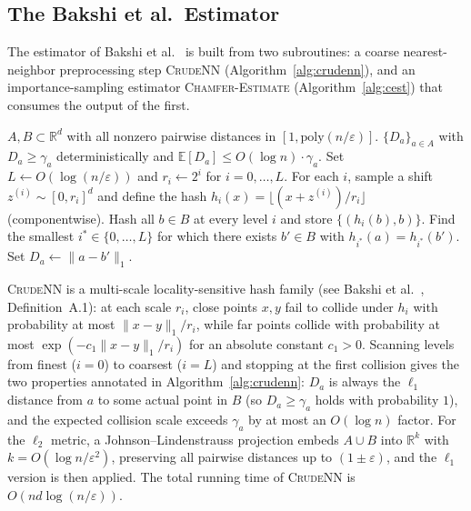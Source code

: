 \documentclass[conference]{IEEEtran}
\begin{document}
\subsection{The Bakshi et al.\ Estimator}
\label{sec:bakshi-summary}

The estimator of Bakshi et al.~\cite{bakshi2023near} is built from two
subroutines: a coarse nearest-neighbor preprocessing step
\textsc{CrudeNN} (Algorithm~\ref{alg:crudenn}), and an importance-sampling
estimator \textsc{Chamfer-Estimate} (Algorithm~\ref{alg:cest}) that
consumes the output of the first.

\begin{algorithm}[t]
\caption{$\textsc{CrudeNN}(A, B)$ for the $\ell_1$ metric}
\label{alg:crudenn}
\begin{algorithmic}[1]
\REQUIRE $A, B \subset \mathbb{R}^d$ with all nonzero pairwise
distances in $[1, \mathrm{poly}(n/\varepsilon)]$.
\ENSURE $\{D_a\}_{a \in A}$ with $D_a \geq \gamma_a$ deterministically
        and $\mathbb{E}[D_a] \leq O(\log n) \cdot \gamma_a$.
\STATE Set $L \gets O(\log(n/\varepsilon))$ and $r_i \gets 2^i$ for
       $i = 0, \dots, L$.
\STATE For each $i$, sample a shift $z^{(i)} \sim [0, r_i]^d$ and
       define the hash $h_i(x) = \lfloor (x + z^{(i)}) / r_i \rfloor$
       (componentwise).
\STATE Hash all $b \in B$ at every level $i$ and store
       $\{(h_i(b), b)\}$.
    \STATE Find the smallest $i^* \in \{0, \dots, L\}$ for which there
           exists $b' \in B$ with $h_{i^*}(a) = h_{i^*}(b')$.
    \STATE Set $D_a \gets \|a - b'\|_1$.
\ENDFOR
\end{algorithmic}
\end{algorithm}

\textsc{CrudeNN} is a multi-scale locality-sensitive hash family
(see Bakshi et al.~\cite{bakshi2023near}, Definition~A.1): at each
scale $r_i$, close points $x, y$ fail to collide under $h_i$ with
probability at most $\|x - y\|_1 / r_i$, while far points collide
with probability at most $\exp(-c_1 \|x - y\|_1 / r_i)$ for an
absolute constant $c_1 > 0$. Scanning levels from finest ($i = 0$) to
coarsest ($i = L$) and stopping at the first collision gives the two
properties annotated in Algorithm~\ref{alg:crudenn}: $D_a$ is always
the $\ell_1$ distance from $a$ to some actual point in $B$ (so
$D_a \geq \gamma_a$ holds with probability $1$), and the expected
collision scale exceeds $\gamma_a$ by at most an $O(\log n)$ factor.
For the $\ell_2$ metric, a Johnson--Lindenstrauss projection embeds
$A \cup B$ into $\mathbb{R}^k$ with $k = O(\log n / \varepsilon^2)$,
preserving all pairwise distances up to $(1 \pm \varepsilon)$, and the
$\ell_1$ version is then applied. The total running time of
\textsc{CrudeNN} is $O(nd \log(n/\varepsilon))$.
\end{document}
